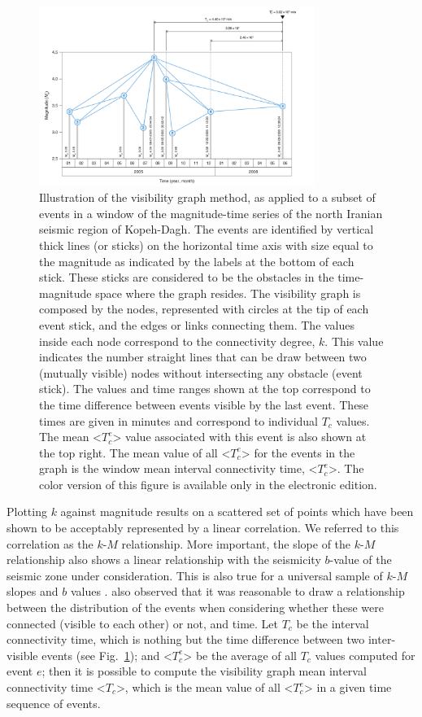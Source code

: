 \begin{figure}[t]
	\centering
	\includegraphics[width=0.8\textwidth]{figures/pdf/figure-01} 
	\caption{Illustration of the visibility graph method, as applied to a subset of events in a window of the magnitude-time series of the north Iranian seismic region of Kopeh-Dagh. The events are identified by vertical thick lines (or sticks) on the horizontal time axis with size equal to the magnitude as indicated by the labels at the bottom of each stick. These sticks are considered to be the obstacles in the time-magnitude space where the graph resides. The visibility graph is composed by the nodes, represented with circles at the tip of each event stick, and the edges or links connecting them. The values inside each node correspond to the connectivity degree, $k$. This value indicates the number straight lines that can be draw between two (mutually visible) nodes without intersecting any obstacle (event stick). The values and time ranges shown at the top correspond to the time difference between events visible by the last event. These times are given in minutes and correspond to individual $T_c$ values. The mean <$T_c^e$> value associated with this event is also shown at the top right. The mean value of all <$T_c^e$> for the events in the graph is the window mean interval connectivity time, <$T_c^e$>. The color version of this figure is available only in the electronic edition.}
	\label{fig:vg}
\end{figure}

Plotting $k$ against magnitude results on a scattered set of points which have been shown to be acceptably represented by a linear correlation. We referred to this correlation as the $k$-$M$ relationship. More important, the slope of the $k$-$M$ relationship also shows a linear relationship with the seismicity $b$-value of the seismic zone under consideration. This is also true for a universal sample of $k$-$M$ slopes and $b$ values \citep{Telesca2013, Telesca2014}. \citet{Telesca2014} also observed that it was reasonable to draw a relationship between the distribution of the events when considering whether these were connected (visible to each other) or not, and time. Let $T_c$ be the interval connectivity time, which is nothing but the time difference between two inter-visible events (see Fig.~\ref{fig:vg}); and <$T_c^e$> be the average of all $T_c$ values computed for event $e$; then it is possible to compute the visibility graph mean interval connectivity time <$T_c$>, which is the mean value of all <$T_c^e$> in a given time sequence of events.

